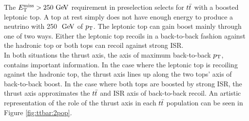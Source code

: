 \indent  The $\met>250 \gev$ requirement in preselection selects for $t\bar{t}$ with a boosted leptonic top.  A top at rest simply does not have enough energy to produce a neutrino with 250 $\gev$ of $p_{\mathrm{T}}$. The leptonic top can gain boost mainly through one of two ways.  Either the leptonic top recoils in a back-to-back fashion against the hadronic top or both tops can recoil against strong ISR.  \\



\indent In both situations the thrust axis, the axis of maximum back-to-back $p_{\mathrm{T}}$, contains important information.  In the case where the leptonic top is recoiling against the hadronic top, the thrust axis lines up along the two tops' axis of back-to-back boost.  In the case where both tops are boosted by strong ISR, the thrust axis approximates the $t\bar{t}$ and ISR axis of back-to-back recoil. An artistic representation of the role of the thrust axis in each $t\bar{t}$ population can be seen in Figure \ref{fig:ttbar:2pop}. \\

